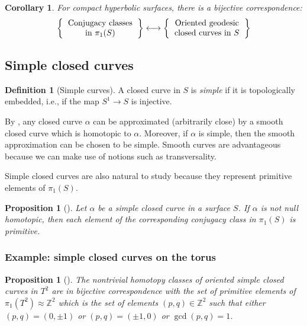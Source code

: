 \documentclass[reqno]{amsart}
\newtheorem{proposition}[theorem]{Proposition}
\newtheorem{corollary}[theorem]{Corollary}
\theoremstyle{definition}
\newtheorem{definition}[theorem]{Definition}
\theoremstyle{remark}
\begin{document}
 \begin{corollary}
     For compact hyperbolic surfaces, 
     there is a bijective correspondence:
\[
\left\{ 
    \begin{tabular}{c}
        Conjugacy classes\\
        in $\pi_1 (S)$
\end{tabular}
\right\} 
\longleftrightarrow
\left\{ 
    \begin{tabular}{c}
        Oriented geodesic\\
        closed curves in $S$
\end{tabular}
\right\} 
\] 
 \end{corollary}

 \subsection{Simple closed curves}
 
\begin{definition}[Simple curves]
    A closed curve in $S$ is \textit{simple} if it is topologically embedded, i.e.,
    if the map $S^{1} \to S$ is injective.  
\end{definition}

By \cite[Thm~11.8]{Bredon}, any closed curve $\alpha$ can be approximated 
(arbitrarily close) by
a smooth closed curve which is homotopic to $\alpha$. Moreover,
if $\alpha$ is simple, then the smooth approximation can be chosen to be
simple. Smooth curves are advantageous because we can make use of notions
such as transversality.

Simple closed curves are also natural to study because they represent
primitive elements of $\pi_1 (S)$.

\begin{proposition}[]
    Let $\alpha$ be a simple closed curve in a surface $S$. If $\alpha$ 
    is not null homotopic, then each element of the corresponding conjugacy
    class in $\pi_1(S)$ is primitive.
\end{proposition}

\subsubsection{Example: simple closed curves on the torus}

\begin{proposition}[]\label{torus-primitive-elts}
    The nontrivial homotopy classes of oriented simple closed
    curves in $T^2$ are in bijective correspondence with the set of primitive
    elements of $\pi_1\left( T^2 \right) \approx \mathbb{Z}^2$ which is
    the set of elements $\left( p,q \right)  \in \mathbb{Z}^2$ such that
    either $(p,q) = (0,\pm 1)$ or  $(p,q) = (\pm 1,0)$ or
     $\gcd(p,q) = 1$.
\end{proposition}
\end{document}
